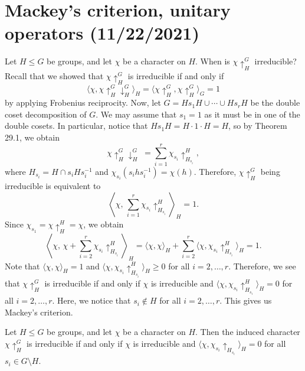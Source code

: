 \section{Mackey's criterion, unitary operators (11/22/2021)}
Let $H \leq G$ be groups, and let $\chi$ be a character on $H$. 
When is $\chi \uparrow_H^G$ irreducible? Recall that we showed that 
$\chi \uparrow_H^G$ is irreducible if and only if 
\[ \langle \chi, \chi \uparrow_H^G \downarrow_H^G \rangle_H = 
\langle \chi \uparrow_H^G, \chi \uparrow_H^G \rangle_G = 1 \] 
by applying Frobenius reciprocity. Now, let $G = Hs_1H \cup \cdots 
\cup Hs_rH$ be the double coset decomposition of $G$. We may assume that 
$s_1 = 1$ as it must be in one of the double cosets. In particular, 
notice that $Hs_1 H = H \cdot 1 \cdot H = H$, so by Theorem 29.1, we obtain 
\[ \chi \uparrow_H^G \downarrow_H^G\; = \sum_{i=1}^r \chi_{s_i} \uparrow_{H_{s_i}}^H, \] 
where $H_{s_i} = H \cap s_i H s_i^{-1}$ and $\chi_{s_i}(s_ihs_i^{-1}) = \chi(h)$. 
Therefore, $\chi \uparrow_H^G$ being irreducible is equivalent to 
\[ \left\langle \chi,\,\sum_{i=1}^r \chi_{s_i} \uparrow_{H_{s_i}}^H \right\rangle_{\!\!H} = 1. \] 
Since $\chi_{s_1} = \chi \uparrow_H^H = \chi$, we obtain 
\[ \left\langle \chi,\, \chi + \sum_{i=2}^r \chi_{s_i} \uparrow_{H_{s_i}}^H \right\rangle_{\!\!H} 
= \langle \chi, \chi \rangle_H + \sum_{i=2}^r \langle \chi, \chi_{s_i} \uparrow_{H_{s_i}}^H \rangle_H = 1. \] 
Note that $\langle \chi, \chi \rangle_H = 1$ and $\langle \chi, \chi_{s_i} \uparrow_{H_{s_i}}^H \rangle_H \geq 0$ 
for all $i = 2, \dots, r$. Therefore, we see that $\chi \uparrow_H^G$ is 
irreducible if and only if $\chi$ is irreducible and $\langle \chi, 
\chi_{s_i} \uparrow_{H_{s_i}}^H \rangle_H = 0$ for all $i = 2, \dots, r$. 
Here, we notice that $s_i \notin H$ for all $i = 2, \dots, r$. This gives 
us Mackey's criterion. 

\begin{theo}{}
    Let $H \leq G$ be groups, and let $\chi$ be a character on $H$. Then 
    the induced character $\chi \uparrow_H^G$ is irreducible if and only if 
    $\chi$ is irreducible and $\langle \chi, \chi_{s_i} \uparrow_{H_{s_i}} \rangle_H = 0$
    for all $s_i \in G \setminus H$. 
\end{theo}

